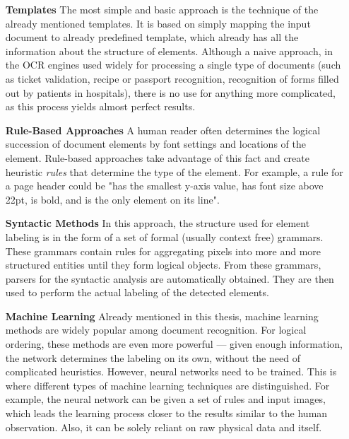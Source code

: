 \begin{itemize}
\item[\textbf{Templates}] The most simple and basic approach is the technique of the already mentioned templates. It is based on simply mapping the input document to already predefined template, which already has all the information about the structure of elements. Although a naive approach, in the OCR engines used widely for processing a single type of documents (such as ticket validation, recipe or passport recognition, recognition of forms filled out by patients in hospitals), there is no use for anything more complicated, as this process yields almost perfect results.

\item[\textbf{Rule-Based Approaches}] A human reader often determines the logical succession of document elements by font settings and locations of the element. Rule-based approaches take advantage of this fact and create heuristic \emph{rules} that determine the type of the element. For example, a rule for a page header could be "has the smallest y-axis value, has font size above 22pt, is bold, and is the only element on its line".

\item[\textbf{Syntactic Methods}] In this approach, the structure used for element labeling is in the form of a set of formal (usually context free) grammars. These grammars contain rules for aggregating pixels into more and more structured entities until they form logical objects. From these grammars, parsers for the syntactic analysis are automatically obtained. They are then used to perform the actual labeling of the detected elements.

\item[\textbf{Machine Learning}] Already mentioned in this thesis, machine learning methods are widely popular among document recognition. For logical ordering, these methods are even more powerful --- given enough information, the network determines the labeling on its own, without the need of complicated heuristics. However, neural networks need to be trained. This is where different types of machine learning techniques are distinguished. For example, the neural network can be given a set of rules and input images, which leads the learning process closer to the results similar to the human observation. Also, it can be solely reliant on raw physical data and itself.

\end{itemize}

